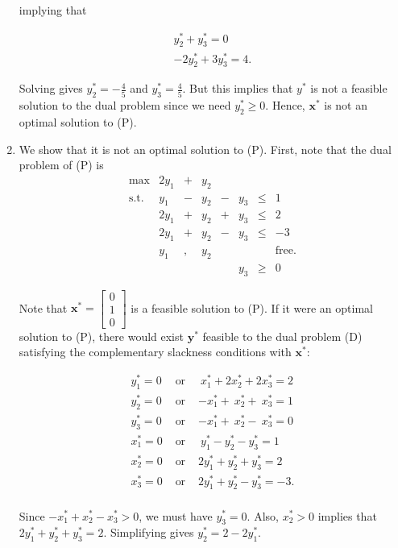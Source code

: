 \documentclass[]{book}
\def\gt{>}
\renewcommand{\vec}[1]{\mathbf{#1}}
\theoremstyle{definition}
\theoremstyle{definition}
\theoremstyle{remark}
\begin{document}
\begin{enumerate}
  implying that

  \begin{eqnarray*}
   y_2^* + y_3^* = 0~ \\ 
  - 2y_2^* + 3y_3^* = 4.
  \end{eqnarray*}

  Solving gives \(y_2^* = -\frac{4}{5}\) and \(y_3^* = \frac{4}{5}\).
  But this implies that \(y^*\) is not a feasible solution to the dual
  problem since we need \(y_2^* \geq 0\). Hence, \(\vec{x}^*\) is not an
  optimal solution to (P).
\item
  We show that it is not an optimal solution to (P). First, note that
  the dual problem of (P) is \[\begin{array}{rrcrcrlll}
  \max & 2y_1 & +& y_2  &   &       \\
  \mbox{s.t.} 
  &  y_1 & - &  y_2 & - &  y_3 & \leq & 1  \\
  & 2 y_1 & + & y_2 & + & y_3  & \leq & 2  \\
  & 2 y_1 & + & y_2 & - & y_3  & \leq & -3  \\
  &  y_1 & , & y_2  &   &      &  & \mbox{free.} \\
  &      &   &      &   & y_3  & \geq  & 0
  \end{array}\]

  Note that \(\vec{x}^* = \begin{bmatrix} 0 \\ 1 \\ 0 \end{bmatrix}\) is
  a feasible solution to (P). If it were an optimal solution to (P),
  there would exist \(\vec{y^*}\) feasible to the dual problem (D)
  satisfying the complementary slackness conditions with \(\vec{x}^*\):

  \begin{eqnarray*}
   y_1^* = 0 & \mbox{ or } &  ~x_1^* + 2x_2^* + 2x_3^* = 2 \\
   y_2^* = 0 & \mbox{ or } &  -x_1^* + ~x_2^* + ~x_3^* = 1 \\
   y_3^* = 0 & \mbox{ or } &  -x_1^* + ~x_2^* - ~x_3^* = 0 \\
   x_1^* = 0 & \mbox{ or } &  ~y_1^* - y_2^* - y_3^* = 1 \\
   x_2^* = 0 & \mbox{ or } &  2y_1^*  + y_2^* + y_3^* =  2 \\
   x_3^* = 0 & \mbox{ or } &  2y_1^*  + y_2^* - y_3^* = -3. \\
  \end{eqnarray*}

  Since \(-x^*_1 + x_2^* - x_3^* \gt 0\), we must have \(y_3^* = 0\).
  Also, \(x_2^* \gt 0\) implies that \(2y_1^* + y_2^* + y_3^* = 2\).
  Simplifying gives \(y_2^* = 2 -2y_1^*\).


\end{enumerate}
\end{document}
